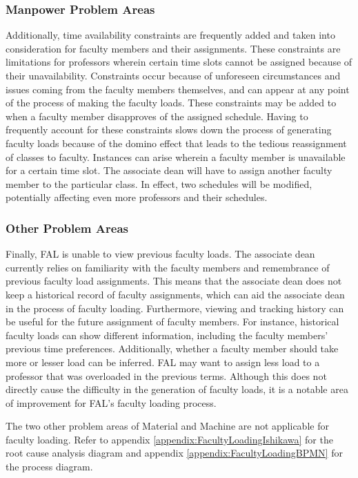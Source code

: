 \subsubsection{Manpower Problem Areas}
Additionally, time availability constraints are frequently added and taken into consideration for faculty members and their assignments. These constraints are limitations for professors wherein certain time slots cannot be assigned because of their unavailability. Constraints occur because of unforeseen circumstances and issues coming from the faculty members themselves, and can appear at any point of the process of making the faculty loads. These constraints may be added to when a faculty member disapproves of the assigned schedule. Having to frequently account for these constraints slows down the process of generating faculty loads because of the domino effect that leads to the tedious reassignment of classes to faculty. Instances can arise wherein a faculty member is unavailable for a certain time slot. The associate dean will have to assign another faculty member to the particular class. In effect, two schedules will be modified, potentially affecting even more professors and their schedules.

\subsubsection{Other Problem Areas}
Finally, FAL is unable to view previous faculty loads. The associate dean currently relies on familiarity with the faculty members and remembrance of previous faculty load assignments. This means that the associate dean does not keep a historical record of faculty assignments, which can aid the associate dean in the process of faculty loading. Furthermore, viewing and tracking history can be useful for the future assignment of faculty members. For instance, historical faculty loads can show different information, including the faculty members’ previous time preferences. Additionally, whether a faculty member should take more or lesser load can be inferred. FAL may want to assign less load to a professor that was overloaded in the previous terms. Although this does not directly cause the difficulty in the generation of faculty loads, it is a notable area of improvement for FAL's faculty loading process.

The two other problem areas of Material and Machine are not applicable for faculty loading. Refer to appendix \ref{appendix:FacultyLoadingIshikawa} for the root cause analysis diagram and appendix \ref{appendix:FacultyLoadingBPMN} for the process diagram.

